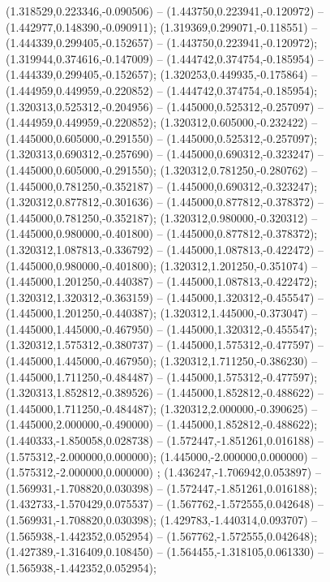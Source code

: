  (1.318529,0.223346,-0.090506) -- (1.443750,0.223941,-0.120972) -- (1.442977,0.148390,-0.090911);
 (1.319369,0.299071,-0.118551) -- (1.444339,0.299405,-0.152657) -- (1.443750,0.223941,-0.120972);
 (1.319944,0.374616,-0.147009) -- (1.444742,0.374754,-0.185954) -- (1.444339,0.299405,-0.152657);
 (1.320253,0.449935,-0.175864) -- (1.444959,0.449959,-0.220852) -- (1.444742,0.374754,-0.185954);
 (1.320313,0.525312,-0.204956) -- (1.445000,0.525312,-0.257097) -- (1.444959,0.449959,-0.220852);
 (1.320312,0.605000,-0.232422) -- (1.445000,0.605000,-0.291550) -- (1.445000,0.525312,-0.257097);
 (1.320313,0.690312,-0.257690) -- (1.445000,0.690312,-0.323247) -- (1.445000,0.605000,-0.291550);
 (1.320312,0.781250,-0.280762) -- (1.445000,0.781250,-0.352187) -- (1.445000,0.690312,-0.323247);
 (1.320312,0.877812,-0.301636) -- (1.445000,0.877812,-0.378372) -- (1.445000,0.781250,-0.352187);
 (1.320312,0.980000,-0.320312) -- (1.445000,0.980000,-0.401800) -- (1.445000,0.877812,-0.378372);
 (1.320312,1.087813,-0.336792) -- (1.445000,1.087813,-0.422472) -- (1.445000,0.980000,-0.401800);
 (1.320312,1.201250,-0.351074) -- (1.445000,1.201250,-0.440387) -- (1.445000,1.087813,-0.422472);
 (1.320312,1.320312,-0.363159) -- (1.445000,1.320312,-0.455547) -- (1.445000,1.201250,-0.440387);
 (1.320312,1.445000,-0.373047) -- (1.445000,1.445000,-0.467950) -- (1.445000,1.320312,-0.455547);
 (1.320312,1.575312,-0.380737) -- (1.445000,1.575312,-0.477597) -- (1.445000,1.445000,-0.467950);
 (1.320312,1.711250,-0.386230) -- (1.445000,1.711250,-0.484487) -- (1.445000,1.575312,-0.477597);
 (1.320313,1.852812,-0.389526) -- (1.445000,1.852812,-0.488622) -- (1.445000,1.711250,-0.484487);
 (1.320312,2.000000,-0.390625) -- (1.445000,2.000000,-0.490000) -- (1.445000,1.852812,-0.488622);
 (1.440333,-1.850058,0.028738) -- (1.572447,-1.851261,0.016188) -- (1.575312,-2.000000,0.000000);
 (1.445000,-2.000000,0.000000) -- (1.575312,-2.000000,0.000000) ;
 (1.436247,-1.706942,0.053897) -- (1.569931,-1.708820,0.030398) -- (1.572447,-1.851261,0.016188);
 (1.432733,-1.570429,0.075537) -- (1.567762,-1.572555,0.042648) -- (1.569931,-1.708820,0.030398);
 (1.429783,-1.440314,0.093707) -- (1.565938,-1.442352,0.052954) -- (1.567762,-1.572555,0.042648);
 (1.427389,-1.316409,0.108450) -- (1.564455,-1.318105,0.061330) -- (1.565938,-1.442352,0.052954);
